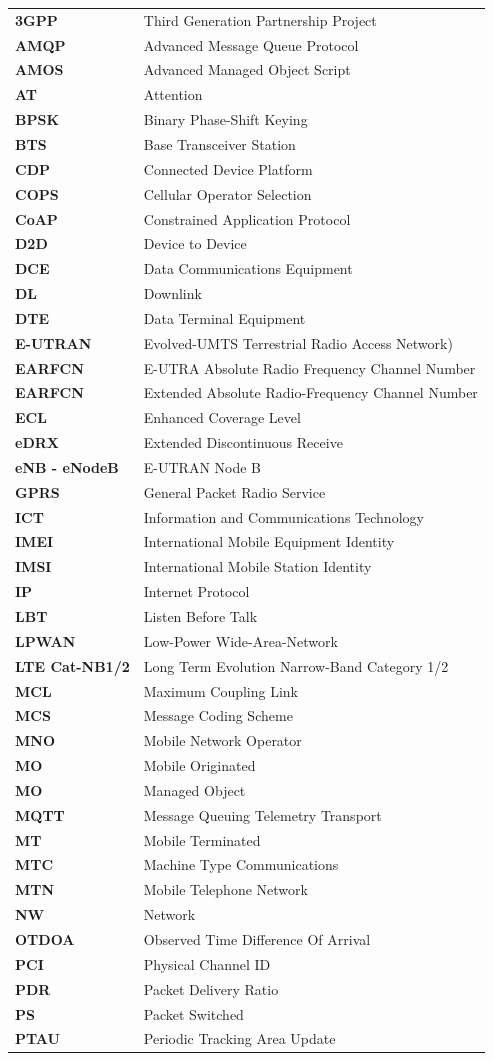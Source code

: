 \documentclass[]{article}
\makeatletter
\newcounter{tableno}
\newenvironment{tablenos:no-prefix-table-caption}{
    \caption@ifcompatibility{}{
    \let\oldthetable\thetable
    \let\oldtheHtable\theHtable
    \renewcommand{\thetable}{tableno:\thetableno}
    \renewcommand{\theHtable}{tableno:\thetableno}
    \stepcounter{tableno}
    \captionsetup{labelformat=empty}
    }
}{
    \caption@ifcompatibility{}{
    \captionsetup{labelformat=default}
    \let\thetable\oldthetable
    \let\theHtable\oldtheHtable
    \addtocounter{table}{-1}
    }
}
\makeatother
\begin{document}
\begin{tablenos:no-prefix-table-caption}

\begin{longtable}[]{@{}ll@{}}
\toprule
\endhead
\textbf{3GPP} & Third Generation Partnership Project\tabularnewline
\textbf{AMQP} & Advanced Message Queue Protocol\tabularnewline
\textbf{AMOS} & Advanced Managed Object Script\tabularnewline
\textbf{AT} & Attention\tabularnewline
\textbf{BPSK} & Binary Phase-Shift Keying\tabularnewline
\textbf{BTS} & Base Transceiver Station\tabularnewline
\textbf{CDP} & Connected Device Platform\tabularnewline
\textbf{COPS} & Cellular Operator Selection\tabularnewline
\textbf{CoAP} & Constrained Application Protocol\tabularnewline
\textbf{D2D} & Device to Device\tabularnewline
\textbf{DCE} & Data Communications Equipment\tabularnewline
\textbf{DL} & Downlink\tabularnewline
\textbf{DTE} & Data Terminal Equipment\tabularnewline
\textbf{E-UTRAN} & Evolved-UMTS Terrestrial Radio Access
Network)\tabularnewline
\textbf{EARFCN} & E-UTRA Absolute Radio Frequency Channel
Number\tabularnewline
\textbf{EARFCN} & Extended Absolute Radio-Frequency Channel
Number\tabularnewline
\textbf{ECL} & Enhanced Coverage Level\tabularnewline
\textbf{eDRX} & Extended Discontinuous Receive\tabularnewline
\textbf{eNB - eNodeB} & E-UTRAN Node B\tabularnewline
\textbf{GPRS} & General Packet Radio Service\tabularnewline
\textbf{ICT} & Information and Communications Technology\tabularnewline
\textbf{IMEI} & International Mobile Equipment Identity\tabularnewline
\textbf{IMSI} & International Mobile Station Identity\tabularnewline
\textbf{IP} & Internet Protocol\tabularnewline
\textbf{LBT} & Listen Before Talk\tabularnewline
\textbf{LPWAN} & Low-Power Wide-Area-Network\tabularnewline
\textbf{LTE Cat-NB1/2} & Long Term Evolution Narrow-Band Category
1/2\tabularnewline
\textbf{MCL} & Maximum Coupling Link\tabularnewline
\textbf{MCS} & Message Coding Scheme\tabularnewline
\textbf{MNO} & Mobile Network Operator\tabularnewline
\textbf{MO} & Mobile Originated\tabularnewline
\textbf{MO} & Managed Object\tabularnewline
\textbf{MQTT} & Message Queuing Telemetry Transport\tabularnewline
\textbf{MT} & Mobile Terminated\tabularnewline
\textbf{MTC} & Machine Type Communications\tabularnewline
\textbf{MTN} & Mobile Telephone Network\tabularnewline
\textbf{NW} & Network\tabularnewline
\textbf{OTDOA} & Observed Time Difference Of Arrival\tabularnewline
\textbf{PCI} & Physical Channel ID\tabularnewline
\textbf{PDR} & Packet Delivery Ratio\tabularnewline
\textbf{PS} & Packet Switched\tabularnewline
\textbf{PTAU} & Periodic Tracking Area Update\tabularnewline

\end{longtable}
\end{tablenos:no-prefix-table-caption}
\end{document}
